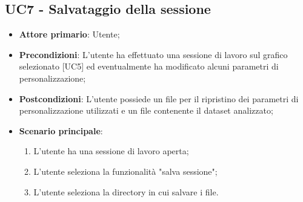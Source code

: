 \subsection{UC7 - Salvataggio della sessione}
\begin{itemize}
	\item \textbf{Attore primario}: Utente;
	\item \textbf{Precondizioni}: L'utente ha effettuato una sessione di lavoro sul grafico selezionato [UC5] ed eventualmente ha modificato alcuni parametri di personalizzazione;
	\item \textbf{Postcondizioni}: L'utente possiede un file  per il ripristino dei parametri di personalizzazione utilizzati e un file  contenente il dataset analizzato;
	\item \textbf{Scenario principale}:
		\begin{enumerate}
			\item L'utente ha una sessione di lavoro aperta;
			\item L'utente seleziona la funzionalità "salva sessione";
			\item L'utente seleziona la directory in cui salvare i file.
		\end{enumerate}
\end{itemize}